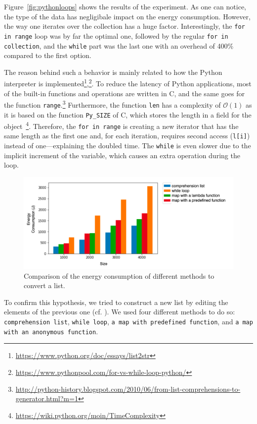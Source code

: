 Figure~\ref{fig:pythonloops} shows the results of the experiment. As one can notice, the type of the data has negligibale impact on the energy consumption.
However, the way one iterates over the collection has a huge factor.
Interestingly, the \texttt{for in range} loop was by far the optimal one, followed by the regular \texttt{for in collection}, and the \texttt{while} part was the last one with an overhead of 400\% compared to the first option.

The reason behind such a behavior is mainly related to how the Python interpreter is implemented\footnote{\url{https://www.python.org/doc/essays/list2str}},\footnote{\url{https://www.pythonpool.com/for-vs-while-loop-python/}}.
To reduce the latency of Python applications, most of the built-in functions and operations are written in C, and the same goes for the function \texttt{range}.\footnote{\url{ http://python-history.blogspot.com/2010/06/from-list-comprehensions-to-generator.html?m=1}}
Furthermore, the function \texttt{len} has a complexity of $\mathcal{O}(1)$ as it is based on the function \texttt{Py\_SIZE} of C, which stores the length in a field for the object~\footnote{\url{https://wiki.python.org/moin/TimeComplexity}}.
Therefore, the \texttt{for in range} is creating a new iterator that has the same length as the first one and, for each iteration, requires second access (\texttt{l[i]}) instead of one---explaining the doubled time.
The \texttt{while} is even slower due to the implicit increment of the variable, which causes an extra operation during the loop.

\begin{figure}
    \centering
    \includegraphics[width=\linewidth]{imgs/python_treatemens}
    \caption{Comparison of the energy consumption of different methods to convert a list.}
    \label{fig:pythontreatement}
\end{figure}


To confirm this hypothesis, we tried to construct a new list by editing the elements of the previous one (cf. ).
We used four different methods to do so: \texttt{comprehension list}, \texttt{while loop}, \texttt{a map with predefined function}, and \texttt{a map with an anonymous function}.


